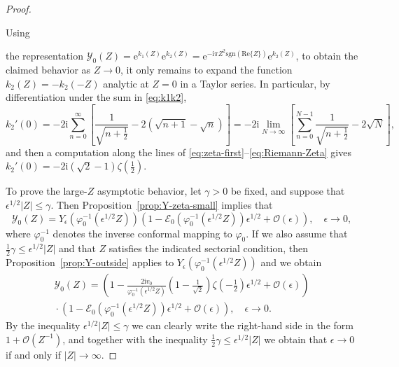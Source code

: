 \documentclass[12pt]{amsart}
\numberwithin{equation}{section}
\newcommand{\ee}{\mathrm{e}}
\newcommand{\ii}{\mathrm{i}}
\newcommand{\bigo}[1]{ \mathcal{O}\! \left( #1 \right) }
\begin{document}
\begin{proof}
\hypertarget{proof:Yzeroasymp}{Using} the representation $\mathcal{Y}_0(Z)=\ee^{k_1(Z)}\ee^{k_2(Z)}=\ee^{-\ii\pi Z^2\mathrm{sgn}(\mathrm{Re}\{Z\})}\ee^{k_2(Z)}$, to obtain the claimed behavior as $Z\to 0$, it only remains to expand the function $k_2(Z)=-k_2(-Z)$ analytic at $Z=0$ in a Taylor series.  In particular,
by differentiation under the sum in \eqref{eq:k1k2},
\begin{equation}
k_2'(0)=-2\ii\sum_{n=0}^{\infty}\left[\frac{1}{\sqrt{n+\tfrac{1}{2}}}-2(\sqrt{n+1}-\sqrt{n})\right]=-2\ii\lim_{N\to\infty}\left[\sum_{n=0}^{N-1}\frac{1}{\sqrt{n+\frac{1}{2}}}-2\sqrt{N}\right],
\end{equation}
and then a computation along the lines of \eqref{eq:zeta-first}--\eqref{eq:Riemann-Zeta} gives $k_2'(0)=-2\ii (\sqrt{2}-1)\zeta(\tfrac{1}{2})$.  

To prove the large-$Z$ asymptotic behavior, let $\gamma>0$ be fixed, and suppose that $\epsilon^{1/2}|Z|\le\gamma$.  Then Proposition~\ref{prop:Y-zeta-small} implies that
\begin{equation}
\mathcal{Y}_0(Z)=Y_\epsilon(\varphi_0^{-1}(\epsilon^{1/2}Z))\left(1-\mathcal{E}_0(\varphi_0^{-1}(\epsilon^{1/2}Z))\epsilon^{1/2} + \bigo{\epsilon}\right),\quad\epsilon\to 0,
\end{equation}
where $\varphi_0^{-1}$ denotes the inverse conformal mapping to $\varphi_0$.  If we also assume that $\frac{1}{2}\gamma\le \epsilon^{1/2}|Z|$ and that $Z$ satisfies the indicated sectorial condition, then Proposition~\ref{prop:Y-outside} applies to $Y_\epsilon(\varphi_0^{-1}(\epsilon^{1/2}Z))$ and we obtain
\begin{multline}
\mathcal{Y}_0(Z)=\left(1-\frac{2\ii v_0}{\varphi_0^{-1}(\epsilon^{1/2}Z)}\left(1-\frac{1}{\sqrt{2}}\right)\zeta(-\tfrac{1}{2})\epsilon^{1/2}+\bigo{\epsilon}\right)\\
{}\cdot\left(1-\mathcal{E}_0(\varphi_0^{-1}(\epsilon^{1/2}Z))\epsilon^{1/2} + \bigo{\epsilon}\right),\quad\epsilon\to 0.
\end{multline}
By the inequality $\epsilon^{1/2}|Z|\le\gamma$ we can clearly write the right-hand side in the form $1+\bigo{Z^{-1}}$, and together with the inequality $\frac{1}{2}\gamma\le\epsilon^{1/2}|Z|$ we obtain that $\epsilon\to 0$ if and only if $|Z|\to\infty$.
\end{proof}

\propYtop*
\end{document}
